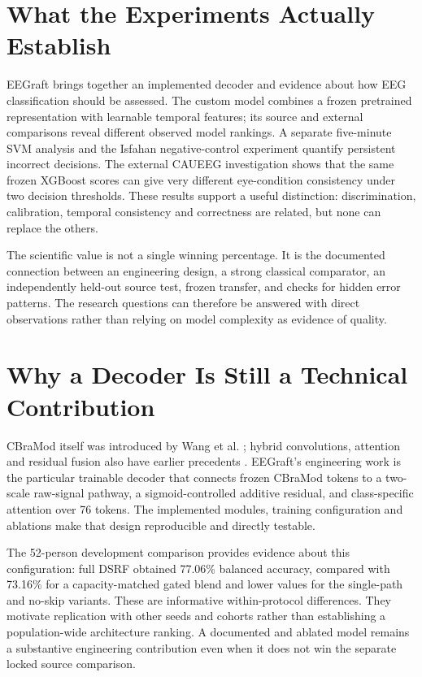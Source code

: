 \section{What the Experiments Actually Establish}
EEGraft brings together an implemented decoder and evidence about how EEG classification should be assessed. The custom model combines a frozen pretrained representation with learnable temporal features; its source and external comparisons reveal different observed model rankings. A separate five-minute SVM analysis and the Isfahan negative-control experiment quantify persistent incorrect decisions. The external CAUEEG investigation shows that the same frozen XGBoost scores can give very different eye-condition consistency under two decision thresholds. These results support a useful distinction: discrimination, calibration, temporal consistency and correctness are related, but none can replace the others.

The scientific value is not a single winning percentage. It is the documented connection between an engineering design, a strong classical comparator, an independently held-out source test, frozen transfer, and checks for hidden error patterns. The research questions can therefore be answered with direct observations rather than relying on model complexity as evidence of quality.

\section{Why a Decoder Is Still a Technical Contribution}
CBraMod itself was introduced by Wang et al. \cite{wang2025cbramod}; hybrid convolutions, attention and residual fusion also have earlier precedents \cite{dice2023,song2023}. EEGraft's engineering work is the particular trainable decoder that connects frozen CBraMod tokens to a two-scale raw-signal pathway, a sigmoid-controlled additive residual, and class-specific attention over 76 tokens. The implemented modules, training configuration and ablations make that design reproducible and directly testable.

The 52-person development comparison provides evidence about this configuration: full DSRF obtained 77.06\% balanced accuracy, compared with 73.16\% for a capacity-matched gated blend and lower values for the single-path and no-skip variants. These are informative within-protocol differences. They motivate replication with other seeds and cohorts rather than establishing a population-wide architecture ranking. A documented and ablated model remains a substantive engineering contribution even when it does not win the separate locked source comparison.

